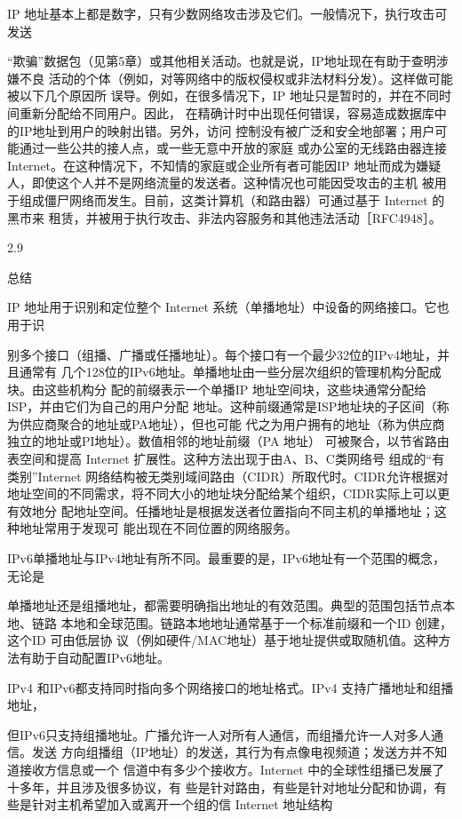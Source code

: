 IP 地址基本上都是数字，只有少数网络攻击涉及它们。一般情况下，执行攻击可发送

“欺骗”数据包（见第5章）或其他相关活动。也就是说，IP地址现在有助于查明涉嫌不良
活动的个体（例如，对等网络中的版权侵权或非法材料分发）。这样做可能被以下几个原因所
误导。例如，在很多情况下，IP 地址只是暂时的，并在不同时间重新分配给不同用户。因此，
在精确计时中出现任何错误，容易造成数据库中的IP地址到用户的映射出错。另外，访问
控制没有被广泛和安全地部署；用户可能通过一些公共的接人点，或一些无意中开放的家庭
或办公室的无线路由器连接Internet。在这种情况下，不知情的家庭或企业所有者可能因IP
地址而成为嫌疑人，即使这个人并不是网络流量的发送者。这种情况也可能因受攻击的主机
被用于组成僵尸网络而发生。目前，这类计算机（和路由器）可通过基于 Internet 的黑市来
租赁，并被用于执行攻击、非法内容服务和其他违法活动［RFC4948］。

2.9

总结

IP 地址用于识别和定位整个 Internet 系统（单播地址）中设备的网络接口。它也用于识

别多个接口（组播、广播或任播地址）。每个接口有一个最少32位的IPv4地址，并且通常有
几个128位的IPv6地址。单播地址由一些分层次组织的管理机构分配成块。由这些机构分
配的前缀表示一个单播IP 地址空间块，这些块通常分配给ISP，并由它们为自己的用户分配
地址。这种前缀通常是ISP地址块的子区间（称为供应商聚合的地址或PA地址），但也可能
代之为用户拥有的地址（称为供应商独立的地址或PI地址）。数值相邻的地址前缀（PA 地址）
可被聚合，以节省路由表空间和提高 Internet 扩展性。这种方法出现于由A、B、C类网络号
组成的“有类别”Internet 网络结构被无类别域间路由（CIDR）所取代时。CIDR允许根据对
地址空间的不同需求，将不同大小的地址块分配给某个组织，CIDR实际上可以更有效地分
配地址空间。任播地址是根据发送者位置指向不同主机的单播地址；这种地址常用于发现可
能出现在不同位置的网络服务。

IPv6单播地址与IPv4地址有所不同。最重要的是，IPv6地址有一个范围的概念，无论是

单播地址还是组播地址，都需要明确指出地址的有效范围。典型的范围包括节点本地、链路
本地和全球范围。链路本地地址通常基于一个标准前缀和一个ID 创建，这个ID 可由低层协
议（例如硬件/MAC地址）基于地址提供或取随机值。这种方法有助于自动配置IPv6地址。

IPv4 和IPv6都支持同时指向多个网络接口的地址格式。IPv4 支持广播地址和组播地址，

但IPv6只支持组播地址。广播允许一人对所有人通信，而组播允许一人对多人通信。发送
方向组播组（IP地址）的发送，其行为有点像电视频道；发送方并不知道接收方信息或一个
信道中有多少个接收方。Internet 中的全球性组播已发展了十多年，并且涉及很多协议，有
些是针对路由，有些是针对地址分配和协调，有些是针对主机希望加入或离开一个组的信
Internet 地址结构

